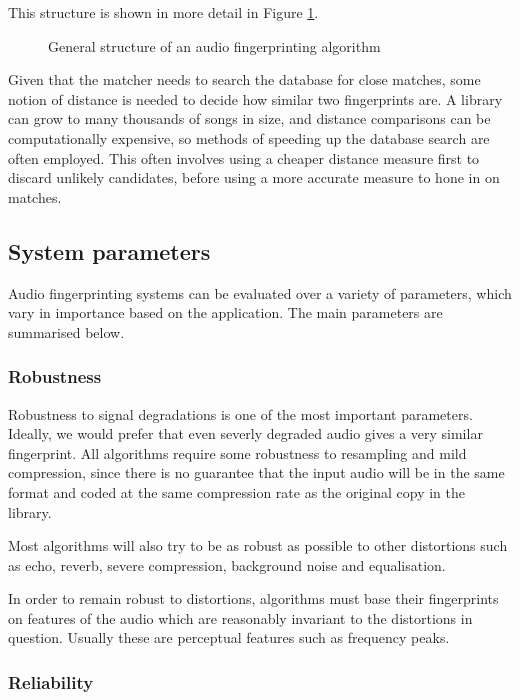 \documentclass[12pt,a4paper,twoside,openright]{report}
\begin{document}
This structure is shown in more detail in Figure \ref{fig:generalframework}. 

\begin{figure}[h]
  \centering
  
  \caption{General structure of an audio fingerprinting algorithm}
  \label{fig:generalframework}
\end{figure}

Given that the matcher needs to search the database for close matches, some notion of distance is needed to decide how similar two fingerprints are. A library can grow to many thousands of songs in size, and distance comparisons can be computationally expensive, so methods of speeding up the database search are often employed. This often involves using a cheaper distance measure first to discard unlikely candidates, before using a more accurate measure to hone in on matches.


\subsection{System parameters}
\label{section:systemparams}

Audio fingerprinting systems can be evaluated over a variety of parameters, which vary in importance based on the application. The main parameters are summarised below.

\subsubsection{Robustness}

Robustness to signal degradations is one of the most important parameters. Ideally, we would prefer that even severly degraded audio gives a very similar fingerprint. All algorithms require some robustness to resampling and mild compression, since there is no guarantee that the input audio will be in the same format and coded at the same compression rate as the original copy in the library.

Most algorithms will also try to be as robust as possible to other distortions such as echo, reverb, severe compression, background noise and equalisation.

In order to remain robust to distortions, algorithms must base their fingerprints on features of the audio which are reasonably invariant to the distortions in question. Usually these are perceptual features such as frequency peaks.

\subsubsection{Reliability}
\end{document}

